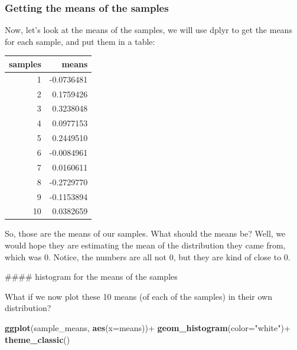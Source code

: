 \documentclass[]{book}
\newenvironment{Shaded}{\begin{snugshade}}{\end{snugshade}}
\newcommand{\KeywordTok}[1]{\textcolor[rgb]{0.13,0.29,0.53}{\textbf{{#1}}}}
\newcommand{\DataTypeTok}[1]{\textcolor[rgb]{0.13,0.29,0.53}{{#1}}}
\newcommand{\StringTok}[1]{\textcolor[rgb]{0.31,0.60,0.02}{{#1}}}
\newcommand{\NormalTok}[1]{{#1}}
\theoremstyle{definition}
\theoremstyle{definition}
\theoremstyle{definition}
\theoremstyle{remark}
\begin{document}
\subsubsection{Getting the means of the
samples}\label{getting-the-means-of-the-samples}

Now, let's look at the means of the samples, we will use dplyr to get
the means for each sample, and put them in a table:

\begin{Shaded}
\end{Shaded}

\begin{tabular}{r|r}
\hline
samples & means\\
\hline
1 & -0.0736481\\
\hline
2 & 0.1759426\\
\hline
3 & 0.3238048\\
\hline
4 & 0.0977153\\
\hline
5 & 0.2449510\\
\hline
6 & -0.0084961\\
\hline
7 & 0.0160611\\
\hline
8 & -0.2729770\\
\hline
9 & -0.1153894\\
\hline
10 & 0.0382659\\
\hline
\end{tabular}

So, those are the means of our samples. What should the means be? Well,
we would hope they are estimating the mean of the distribution they came
from, which was 0. Notice, the numbers are all not 0, but they are kind
of close to 0.

\#\#\#\# histogram for the means of the samples

What if we now plot these 10 means (of each of the samples) in their own
distribution?

\begin{Shaded}
\begin{Highlighting}[]
 \KeywordTok{ggplot}\NormalTok{(sample_means, }\KeywordTok{aes}\NormalTok{(}\DataTypeTok{x=}\NormalTok{means))+}
\StringTok{  }\KeywordTok{geom_histogram}\NormalTok{(}\DataTypeTok{color=}\StringTok{"white"}\NormalTok{)+}
\StringTok{  }\KeywordTok{theme_classic}\NormalTok{()}
\end{Highlighting}
\end{Shaded}
\end{document}
